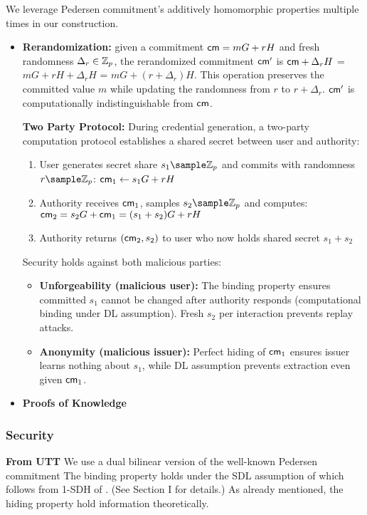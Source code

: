 We leverage Pedersen commitment's additively homomorphic properties multiple times in our construction. 
\begin{itemize}
    \item \textbf{Rerandomization: } given a commitment $\mathsf{cm} = mG + rH$ and fresh randomness $\Delta_r \in \mathbb{Z}_p$, the rerandomized commitment $\mathsf{cm}'$ is $\mathsf{cm} + \Delta_rH$ = $mG + rH + \Delta_rH$ = $mG + (r+\Delta_r)H$. This operation preserves the committed value $m$ while updating the randomness from $r$ to $r + \Delta_r$. $\mathsf{cm}'$ is computationally indistinguishable from $\mathsf{cm}$.

    \textbf{Two Party Protocol:} During credential generation, a two-party computation protocol establishes a shared secret between user and authority:
    \begin{enumerate}
        \item User generates secret share $s_1 \sample \Z_p$ and commits with randomness $r \sample \Z_p$: 
            $\mathsf{cm}_1 \gets s_1G + rH$
        \item Authority receives $\mathsf{cm}_1$, samples $s_2 \sample \Z_p$ and computes:
            $\mathsf{cm}_2 = s_2G + \mathsf{cm}_1 = (s_1 + s_2)G + rH$
        \item Authority returns $(\mathsf{cm}_2, s_2)$ to user who now holds shared secret $s_1 + s_2$
    \end{enumerate}
    
    Security holds against both malicious parties:
    \begin{itemize}
        \item \textbf{Unforgeability (malicious user):} The binding property ensures committed $s_1$ cannot be changed after authority responds (computational binding under DL assumption). Fresh $s_2$ per interaction prevents replay attacks.
        \item \textbf{Anonymity (malicious issuer):} Perfect hiding of $\mathsf{cm}_1$ ensures issuer learns nothing about $s_1$, while DL assumption prevents extraction even given $\mathsf{cm}_1$.
    \end{itemize}

    \item \textbf{Proofs of Knowledge}
    
\end{itemize}

\subsubsection{Security}
\textbf{From UTT}
We use a dual bilinear version of the well-known Pedersen commitment \cite{feigenbaum_non-interactive_1992}
The binding property holds under the SDL assumption of \cite{hutchison_get_2010}
which follows from 1-SDH of \cite{boneh_short_2008}. (See Section I for details.) 
As already mentioned, the hiding property hold information theoretically.



